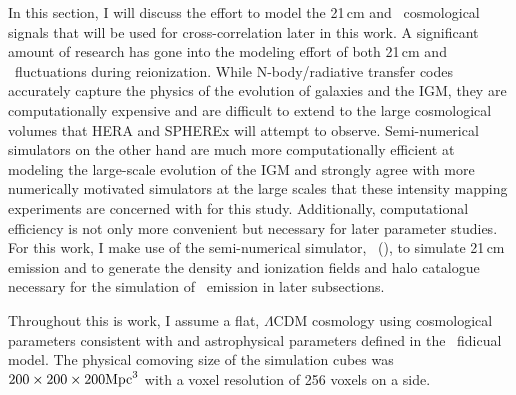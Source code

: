 In this section, I will discuss the effort to model the 21\,cm and \lya\
cosmological signals that will be used for cross-correlation later in this work.
A significant amount of research has gone into the modeling effort of both 21\,cm and
\lya\ fluctuations during reionization. While N-body/radiative
transfer codes accurately capture the physics of the evolution of
galaxies and the IGM, they are computationally
expensive and are difficult to extend to the large cosmological volumes that HERA and SPHEREx will
attempt to observe. Semi-numerical simulators on the other hand are much more
computationally efficient at modeling the large-scale evolution of the IGM and
strongly agree with more numerically motivated simulators at the large scales that
these intensity mapping experiments are concerned with for this study.
Additionally, computational efficiency is not only more convenient but necessary for later parameter studies.
For this work, I make use of the semi-numerical
simulator, \fastsim\ (\cite{2011MNRAS.411..955M}),
to simulate 21\,cm emission and to generate the density and ionization fields and halo catalogue
necessary for the simulation of \lya\ emission in later subsections.

Throughout this is work, I assume a flat, $\Lambda$CDM cosmology using cosmological
parameters consistent with \cite{2016A&A...594A..13P} and astrophysical
parameters defined in the \fastsim\ fidicual model. The physical comoving size of the
simulation cubes was $200 \times 200 \times 200 {\rm Mpc}^3$ with a voxel resolution
of 256 voxels on a side.
